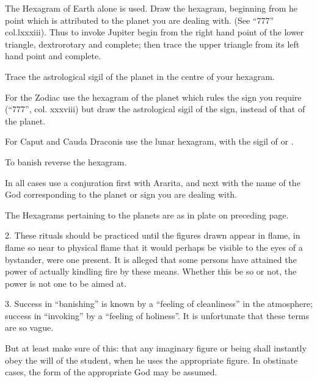 
The Hexagram of Earth alone is used. Draw the hexagram, beginning from he point which is attributed to the planet you are dealing with. (See \enquote{777} col.lxxxiii). Thus to invoke Jupiter begin from the right hand point of the lower triangle, dextrorotary and complete; then trace the upper triangle from its left hand point and complete.

Trace the astrological sigil of the planet in the centre of your hexagram.

For the Zodiac use the hexagram of the planet which rules the sign you require (\enquote{777}, col. xxxviii) but draw the astrological sigil of the sign, instead of that of the planet.

For Caput and Cauda Draconis use the lunar hexagram, with the sigil of \rahu{} or \rahur{}.

To banish reverse the hexagram.

In all cases use a conjuration first with Ararita, and next with the name of the God corresponding to the planet or sign you are dealing with.

The Hexagrams pertaining to the planets are as in plate on preceding page.

2. These rituals should be practiced until the figures drawn appear in flame, in flame so near to physical flame that it would perhaps be visible to the eyes of a bystander, were one present. It is alleged that some persons have attained the power of actually kindling fire by these means. Whether this be so or not, the power is not one to be aimed at.

3. Success in \enquote{banishing} is known by a \enquote{feeling of cleanliness} in the atmosphere; success in \enquote{invoking} by a \enquote{feeling of holiness}. It is unfortunate that these terms are so vague.

But at least make sure of this: that any imaginary figure or being shall instantly obey the will of the student, when he uses the appropriate figure. In obstinate cases, the form of the appropriate God may be assumed.

